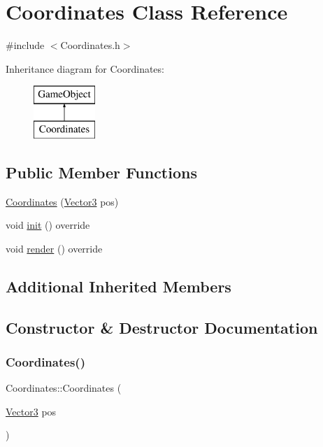 \hypertarget{class_coordinates}{}\section{Coordinates Class Reference}
\label{class_coordinates}


{\ttfamily \#include $<$Coordinates.\+h$>$}

Inheritance diagram for Coordinates\+:\begin{figure}[H]
\begin{center}
\leavevmode
\includegraphics[height=2.000000cm]{class_coordinates}
\end{center}
\end{figure}
\subsection*{Public Member Functions}
\begin{DoxyCompactItemize}
\item 
\hyperlink{class_coordinates_a1491cf3cc0f7281978bd289a2100a16c}{Coordinates} (\hyperlink{class_vector3}{Vector3} pos)
\item 
void \hyperlink{class_coordinates_aaadf934b8f184a9e0abe504e4c2da9b1}{init} () override
\item 
void \hyperlink{class_coordinates_afa2d40b313b3b2933f9030ebfbe31045}{render} () override
\end{DoxyCompactItemize}
\subsection*{Additional Inherited Members}


\subsection{Constructor \& Destructor Documentation}
\mbox{\label{class_coordinates_a1491cf3cc0f7281978bd289a2100a16c}} 
\subsubsection{\texorpdfstring{Coordinates()}{Coordinates()}}
{\footnotesize\ttfamily Coordinates\+::\+Coordinates (\begin{DoxyParamCaption}\item[{\hyperlink{class_vector3}{Vector3}}]{pos }\end{DoxyParamCaption})\hspace{0.3cm}{\ttfamily [inline]}}



